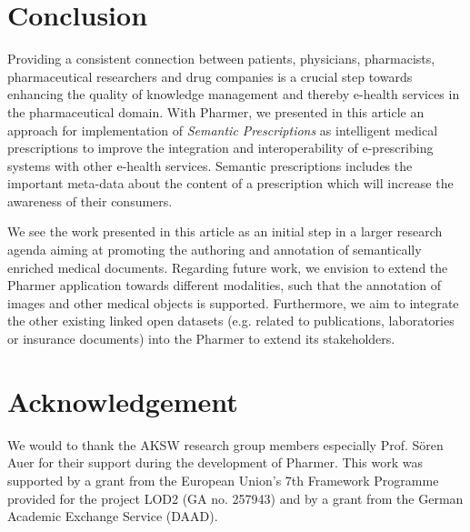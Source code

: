\documentclass[conference]{IEEEtran}
\begin{document}
\section{Conclusion}
\label{sec:conclusion}
Providing a consistent connection between patients, physicians, pharmacists, pharmaceutical researchers and drug companies is a crucial step towards enhancing the quality of knowledge management and thereby e-health services in the pharmaceutical domain.
With Pharmer, we presented in this article an approach for implementation of \emph{Semantic Prescriptions} as intelligent medical prescriptions to improve the integration and interoperability of e-prescribing systems with other e-health services.
Semantic prescriptions includes the important meta-data about the content of a prescription which will increase the awareness of their consumers.

We see the work presented in this article as an initial step in a larger research agenda aiming at promoting the authoring and annotation of semantically enriched medical documents.
Regarding future work, we envision to extend the Pharmer application towards different modalities, such that the annotation of images and other medical objects is supported.
Furthermore, we aim to integrate the other existing linked open datasets (e.g. related to publications, laboratories or insurance documents) into the Pharmer to extend its stakeholders.


\section*{Acknowledgement}

We would to thank the AKSW research group members especially Prof. Sören Auer for their support during the development of Pharmer.
This work was supported by a grant from the European Union's 7th Framework Programme provided for the project LOD2 (GA no. 257943) and by a grant from the German Academic Exchange Service (DAAD).




\end{document}
